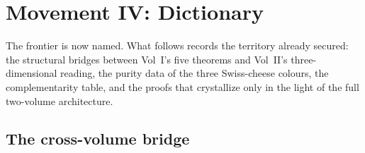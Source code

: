 \section*{Movement IV\@: Dictionary}

The frontier is now named. What follows records the
territory already secured: the structural bridges between
Vol~I's five theorems and Vol~II's three-dimensional reading, the
purity data of the three Swiss-cheese colours, the complementarity
table, and the proofs that crystallize only in the light of the full
two-volume architecture.

\subsection{The cross-volume bridge}


